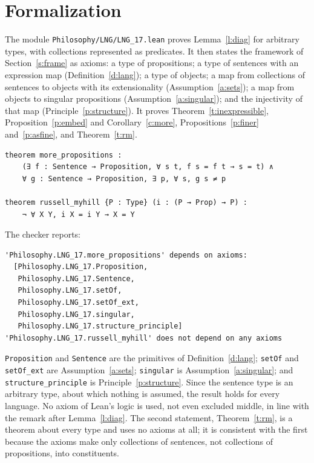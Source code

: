 \documentclass{situationist-preprint}
\begin{document}
\section{Formalization}\label{s:formal}

The module \nolinkurl{Philosophy/LNG/LNG_17.lean} proves Lemma~\ref{l:diag} for arbitrary types, with collections represented as predicates. It then states the framework of Section~\ref{s:frame} as axioms: a type of propositions; a type of sentences with an expression map (Definition~\ref{d:lang}); a type of objects; a map from collections of sentences to objects with its extensionality (Assumption~\ref{a:sets}); a map from objects to singular propositions (Assumption~\ref{a:singular}); and the injectivity of that map (Principle~\ref{p:structure}). It proves Theorem~\ref{t:inexpressible}, Proposition~\ref{p:embed} and Corollary~\ref{c:more}, Propositions~\ref{p:finer} and~\ref{p:asfine}, and Theorem~\ref{t:rm}.

\begin{lstlisting}
theorem more_propositions :
    (∃ f : Sentence → Proposition, ∀ s t, f s = f t → s = t) ∧
    ∀ g : Sentence → Proposition, ∃ p, ∀ s, g s ≠ p

theorem russell_myhill {P : Type} (i : (P → Prop) → P) :
    ¬ ∀ X Y, i X = i Y → X = Y
\end{lstlisting}

The checker reports:

\begin{lstlisting}
'Philosophy.LNG_17.more_propositions' depends on axioms:
  [Philosophy.LNG_17.Proposition,
   Philosophy.LNG_17.Sentence,
   Philosophy.LNG_17.setOf,
   Philosophy.LNG_17.setOf_ext,
   Philosophy.LNG_17.singular,
   Philosophy.LNG_17.structure_principle]
'Philosophy.LNG_17.russell_myhill' does not depend on any axioms
\end{lstlisting}

\texttt{Proposition} and \texttt{Sentence} are the primitives of Definition~\ref{d:lang}; \texttt{setOf} and \texttt{setOf\_ext} are Assumption~\ref{a:sets}; \texttt{singular} is Assumption~\ref{a:singular}; and \texttt{structure\_principle} is Principle~\ref{p:structure}. Since the sentence type is an arbitrary type, about which nothing is assumed, the result holds for every language. No axiom of Lean's logic is used, not even excluded middle, in line with the remark after Lemma~\ref{l:diag}. The second statement, Theorem~\ref{t:rm}, is a theorem about every type and uses no axioms at all; it is consistent with the first because the axioms make only collections of sentences, not collections of propositions, into constituents.
\end{document}

